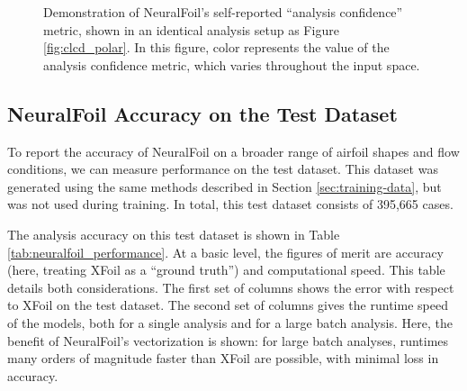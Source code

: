 \documentclass[journal]{new-aiaa}
\begin{document}
\begin{figure}[H]
    \centering
    
    \caption{Demonstration of NeuralFoil's self-reported ``analysis confidence'' metric, shown in an identical analysis setup as Figure \ref{fig:clcd_polar}. In this figure, color represents the value of the analysis confidence metric, which varies throughout the input space.}
    \label{fig:clcd_polar_with_uq}
\end{figure}

\subsection{NeuralFoil Accuracy on the Test Dataset}

To report the accuracy of NeuralFoil on a broader range of airfoil shapes and flow conditions, we can measure performance on the test dataset. This dataset was generated using the same methods described in Section \ref{sec:training-data}, but was not used during training. In total, this test dataset consists of 395,665 cases.

The analysis accuracy on this test dataset is shown in Table \ref{tab:neuralfoil_performance}. At a basic level, the figures of merit are accuracy (here, treating XFoil as a ``ground truth'') and computational speed. This table details both considerations. The first set of columns shows the error with respect to XFoil on the test dataset. The second set of columns gives the runtime speed of the models, both for a single analysis and for a large batch analysis. Here, the benefit of NeuralFoil's vectorization is shown: for large batch analyses, runtimes many orders of magnitude faster than XFoil are possible, with minimal loss in accuracy.
\end{document}
